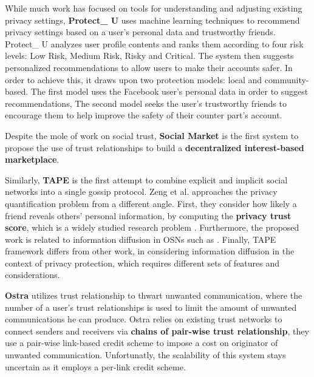 While much work has focused on tools for understanding and adjusting existing privacy settings,
	\textbf{Protect\_ U} \cite{gandouz_protect_2012}uses machine learning techniques to recommend privacy settings based on a user’s personal data and trustworthy friends.
Protect\_ U analyzes user profile contents and ranks them according to four risk levels: Low Risk,
	Medium Risk,
	Risky and Critical.
The system then suggests personalized recommendations to allow users to make their accounts safer.
In order to achieve this,
	it draws upon two protection models: local and community-based.
The first model uses the Facebook user’s personal data in order to suggest recommendations,
The second model seeks the user’s trustworthy friends to encourage them to help improve the safety of their counter part’s account.

Despite the mole of work on social trust,
	\textbf{Social Market} is the first system to propose the use of trust relationships to build a \textbf{decentralized interest-based marketplace}.

Similarly,
	\textbf{TAPE} \cite{yongbozeng_study_2015} is the first attempt to combine explicit and implicit social networks into a single gossip protocol.
Zeng et al. \cite{yongbozeng_study_2015} approaches the privacy quantification problem from a different angle.
First,
	they consider how likely a friend reveals others’ personal information,
	by computing the \textbf{privacy trust score},
	which is a widely studied research problem \cite{gundecha_exploiting_2011}.
Furthermore,
	the proposed work is related to information diffusion in OSNs such as \cite{fang_privacy_2010}.
Finally,
TAPE framework differs from other work,
	in considering information diffusion in the context of privacy protection,
	which requires different sets of features and considerations.


\textbf{Ostra} \cite{mislove_ostra_2008} utilizes trust relationship to thwart unwanted communication,
	where the number of a user’s trust relationships is used to limit the amount of unwanted communications he can produce.
Ostra relies on existing trust networks to connect senders and receivers via \textbf{chains of pair-wise trust relationship},
	they use a pair-wise link-based credit scheme to impose a cost on originator of unwanted communication.
Unfortunatly,
	the scalability of this system stays uncertain as it employs a per-link credit scheme.

